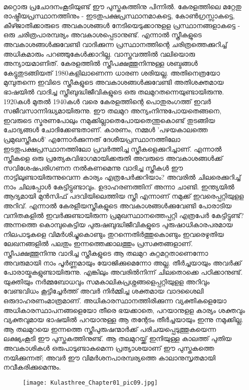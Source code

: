 \paragraph{} മറ്റൊരു പ്രചോദനംകൂടിയുണ്ട് ഈ പുസ്തകത്തിനു പിന്നിൽ. കേരളത്തിലെ മറ്റേതു രാഷ്ട്രീയപ്രസ്ഥാനത്തിനും - ഇടതുപക്ഷപ്രസ്ഥാനമാകട്ടെ, കോൺഗ്രസ്സാകട്ടെ, കീഴ്ജാതിക്കാരുടെ അവകാശങ്ങൾ നേടിയെടുക്കാനുളള പ്രസ്ഥാനങ്ങളാകട്ടെ - ഒരു ചരിത്രപാരമ്പര്യം അവകാശപ്പെടാനുണ്ട്. എന്നാൽ സ്ത്രീകളുടെ അവകാശങ്ങൾക്കുവേണ്ടി വാദിക്കുന്ന പ്രസ്ഥാനത്തിന്റെ ചരിത്രത്തെക്കുറിച്ച് അധികമാരും പറഞ്ഞുകേൾക്കാറില്ല. വാസ്തവത്തിൽ വലിയൊരു അന്യായമാണിത്. കേരളത്തിൽ സ്ത്രീപക്ഷത്തുനിന്നുള്ള ശബ്ദങ്ങൾ കേട്ടുതുടങ്ങിയത് 1980കളിലാണെന്ന ധാരണ ശരിയല്ല. അതിനെത്രയോ മുമ്പുതന്നെ ഇവിടെ സ്ത്രീകളുടെ അവകാശങ്ങൾക്കുവേണ്ടി അതിശക്തമായ ഭാഷയിൽ വാദിച്ച സ്ത്രീബുദ്ധിജീവികളുടെ ഒരു തലമുറതന്നെയുണ്ടായിരുന്നു. 1920കൾ മുതൽ 1940കൾ വരെ കേരളത്തിന്റെ പൊതുരംഗത്ത് ഇവർ സജീവസാന്നിദ്ധ്യമായിരുന്നു. ഈ തലമുറ അന്യംനിന്നുപോയതെങ്ങനെ, ഇവരുടെ സ്മരണപോലും നമുക്കില്ലാതെപോയതെന്തുകൊണ്ട് തുടങ്ങിയ ചോദ്യങ്ങൾ ചോദിക്കേണ്ടതാണ്. കാരണം, നമ്മൾ 'പഴയകാലത്തെ പ്രമുഖസ്ത്രീകൾ' എന്നോർക്കുന്നത് ദേശീയപ്രസ്ഥാനത്തിലോ ഇടതുപക്ഷപ്രസ്ഥാനത്തിലോ പ്രവർത്തിച്ച സ്ത്രീകളെക്കുറിച്ചാണ്. എന്നാൽ സ്ത്രീകളെ ഒരു പ്രത്യേകവിഭാഗമായിക്കരുതി അവരുടെ അവകാശങ്ങൾക്ക് സവിശേഷപരിഗണന നൽകണമെന്നു വാദിച്ച സ്ത്രീകൾ ഈ നാട്ടിലുണ്ടായിരുന്നുവെന്ന കാര്യം എത്രപേർക്കറിയാം? അവരിൽ ചിലരെക്കുറിച്ച് നാം ചിലപ്പോൾ കേട്ടിട്ടുണ്ടാവും. ഉദാഹരണത്തിന് അന്നാ ചാണ്ടി. ഇന്ത്യയിൽ ആദ്യമായി മുൻസിഫ് പദവിയിലെത്തിയ സ്ത്രീ എന്നാണ് നമുക്ക് ഇവരെപ്പറ്റിയുളള അറിവ്. എന്നാൽ കേരളീയസ്ത്രീകളുടെ അവകാശങ്ങൾക്കുവേണ്ടി പോരാടിയ വനിതകളിൽ ഇവർക്കുണ്ടായിരുന്ന പ്രമുഖസ്ഥാനത്തെപ്പറ്റി എത്രപേർ കേട്ടിട്ടുണ്ട്?
അന്നത്തെ കൊമ്പുകെട്ടിയ പുരുഷബുദ്ധിജീവികളുടെ പുരുഷാധികാരപരമായ നിലപാടുകളെ വിമർശിച്ചുകൊണ്ടും തുറന്നെതിർത്തുകൊണ്ടും ഇവരെഴുതിയ ലേഖനങ്ങളിൽ പലതും ഇന്നത്തെക്കാലത്തും പ്രസക്തങ്ങളാണ്. സ്ത്രീപക്ഷത്തുനിന്നു വാദിച്ച സ്ത്രീകളുടെ ആ തലമുറ കുറ്റമറ്റതാണെന്നോ അവരുമായി നാം പൂർണ്ണമായും യോജിക്കുമെന്നോ അല്ല. തീർച്ചയായും അവർക്ക് പോരായ്മകളുണ്ടായിരുന്നു. എങ്കിലും അവരിൽനിന്ന് ചിലതൊക്കെ പഠിക്കാനുണ്ട്. യുക്തിയും നർമ്മബോധവും സമകാലികപ്രശ്നങ്ങളെപ്പറ്റിയുളള അറിവും വേണ്ടവിധം കൂട്ടിച്ചേർത്ത് അവർ നിർമ്മിച്ച ശക്തമായ വാദശൈലി ഒരുദാഹരണംമാത്രമാണ്. അധികാരസ്ഥാനത്തിരിക്കുന്ന വ്യക്തികളെയോ അധികാരസ്ഥാപനങ്ങളെയോ തീരെ ഭയക്കാതെ, പറയാനുളള കാര്യം ശക്തവും വ്യക്തവുമായ ഭാഷയിൽ പറയാനുള്ള ആ തന്റേടം തീർച്ചയായും ഇന്നു നമുക്കില്ല. ആ തലമുറയെ ഇന്നത്തെ സ്ത്രീപുരുഷന്മാർക്ക് പരിചയപ്പെടുത്തുകയെന്ന ലക്ഷ്യംകൂടി ഈ പുസ്തകത്തിനുണ്ട്. ആ തലമുറയ്ക്ക് ഇനിയുള്ള കാലത്ത് പുതിയ അവകാശികൾ ഒരുപാടുണ്ടാകുമെന്ന പ്രത്യാശയാണ് ഈ പുസ്തകത്തെ നയിക്കുന്നത്; അവർ ഈ വിമർശനപാരമ്പര്യത്തെ കാലാനുസൃതമായി നവീകരിക്കുമെന്നും. 

\begin{figure}[h]
\begin{center}
\texttt{[image: Kulasthree\_Chapter01\_pic09.jpg]}
\end{center}
\end{figure}
